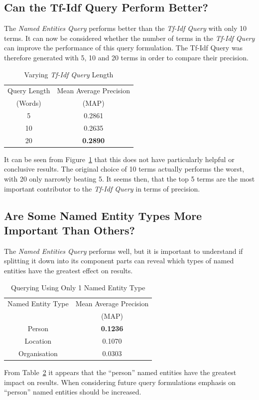 \documentclass{l4proj}
\begin{document}
\subsection{Can the Tf-Idf Query Perform Better?}
The \textit{Named Entities Query} performs better than the \textit{Tf-Idf Query} with only 10 terms. It can now be considered whether the number of terms in the \textit{Tf-Idf Query} can improve the performance of this query formulation. The Tf-Idf Query was therefore generated with 5, 10 and 20 terms in order to compare their precision.
\begin{table}[H]
\centering
\begin{tabular}{|c|c|}
\hline
Query Length 	& Mean Average Precision	\\ 
(Words) 		& (MAP) 					\\ \hline
5             	& 0.2861 					\\ \hline
10        		& 0.2635 					\\ \hline
20 				& \textbf{0.2890} 			\\ \hline
\end{tabular}
\caption{Varying \textit{Tf-Idf Query} Length}
\label{tfidflengthresults}
\end{table}
It can be seen from Figure~\ref{tfidflengthresults} that this does not have particularly helpful or conclusive results. The original choice of 10 terms actually performs the worst, with 20 only narrowly beating 5. It seems then, that the top 5 terms are the most important contributor to the \textit{Tf-Idf Query} in terms of precision.
\subsection{Are Some Named Entity Types More Important Than Others?}
The \textit{Named Entities Query} performs well, but it is important to understand if splitting it down into its component parts can reveal which types of named entities have the greatest effect on results.
\begin{table}[H]
\centering
\begin{tabular}{|c|c|}
\hline
Named Entity Type 	& Mean Average Precision	\\ 
					& (MAP) 					\\ \hline
Person          	& \textbf{0.1236} 					\\ \hline
Location			& 0.1070 					\\ \hline
Organisation 		& 0.0303 					\\ \hline
\end{tabular}
\caption{Querying Using Only 1 Named Entity Type}
\label{namedentityresults}
\end{table}
From Table~\ref{namedentityresults} it appears that the ``person'' named entities have the greatest impact on results. When considering future query formulations emphasis on ``person'' named entities should be increased.
\end{document}
